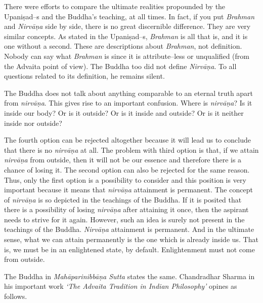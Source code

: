 There were efforts to compare the ultimate realities propounded by the Upaniṣad–s and the Buddha’s teaching, at all times. In fact, if you put \textit{Brahman} and \textit{Nirvāṇa} side by side, there is no great discernible difference. They are very similar concepts. As stated in the Upaniṣad–s, \textit{Brahman} is all that is, and it is one without a second. These are descriptions about \textit{Brahman}, not definition. Nobody can say what \textit{Brahman} is since it is attribute–less or unqualified (from the Advaita point of view). The Buddha too did not define \textit{Nirvāṇa}. To all questions related to its definition, he remains silent.

The Buddha does not talk about anything comparable to an eternal truth apart from \textit{nirvāṇa}. This gives rise to an important confusion. Where is \textit{nirvāṇa}? Is it inside our body? Or is it outside? Or is it inside and outside? Or is it neither inside nor outside?

The fourth option can be rejected altogether because it will lead us to conclude that there is no \textit{nirvāṇa} at all. The problem with third option is that, if we attain \textit{nirvāṇa} from outside, then it will not be our essence and therefore there is a chance of losing it. The second option can also be rejected for the same reason. Thus, only the first option is a possibility to consider and this position is very important because it means that \textit{nirvāṇa} attainment is permanent. The concept of \textit{nirvāṇa} is so depicted in the teachings of the Buddha. If it is posited that there is a possibility of losing \textit{nirvāṇa} after attaining it once, then the aspirant needs to strive for it again. However, such an idea is surely not present in the teachings of the Buddha. \textit{Nirvāṇa} attainment is permanent. And in the ultimate sense, what we can attain permanently is the one which is already inside us. That is, we must be in an enlightened state, by default. Enlightenment must not come from outside.

The Buddha in \textit{Mahāparinibbāṇa Sutta} states the same. Chandradhar Sharma in his important work \textit{‘The Advaita Tradition in Indian Philosophy’} opines as follows.

